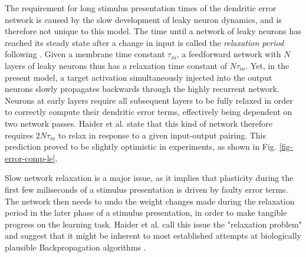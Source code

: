 The requirement for long stimulus presentation times of the dendritic error network is caused by the slow development of
leaky neuron dynamics, and is therefore not unique to this model. The time until a network of leaky neurons has reached
its steady state after a change in input is called the \textit{relaxation period} following \citep{Haider2021}. Given a
membrane time constant $\tau_m$, a feedforward network with $N$ layers of leaky neurons thus has a relaxation time
constant of $N \tau_m$. Yet, in the present model, a target activation simultaneously injected into the output neurons
slowly propagates backwards through the highly recurrent network. Neurons at early layers require all subsequent layers
to be fully relaxed in order to correctly compute their dendritic error terms, effectively being dependent on two
network passes. Haider et al. state that this kind of network therefore requires $2N\tau_m$ to relax in response to a
given input-output pairing. This prediction proved to be slightly optimistic in experiments, as shown in Fig.
\ref{fig-error-comp-le}.


Slow network relaxation is a major issue, as it implies that plasticity during the first few miliseconds of a stimulus
presentation is driven by faulty error terms. The network then needs to undo the weight changes made during the
relaxation period in the later phase of a stimulus presentation, in order to make tangible progress on the learning
task. Haider et al. call this issue the "relaxation problem" and suggest that it might be inherent to most established
attempts at biologically plausible Backpropagation algorithms
\citep{Whittington2017,guerguiev2017towards,sacramento2018dendritic,millidge2020activation}.



